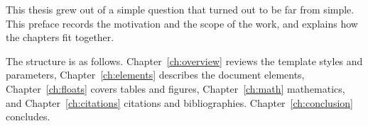 \begin{frontchapter}[Preface]
This thesis grew out of a simple question that turned out to be far from
simple. This preface records the motivation and the scope of the work,
and explains how the chapters fit together.

The structure is as follows. Chapter~\ref{ch:overview} reviews the
template styles and parameters, Chapter~\ref{ch:elements} describes the
document elements, Chapter~\ref{ch:floats} covers tables and figures,
Chapter~\ref{ch:math} mathematics, and Chapter~\ref{ch:citations}
citations and bibliographies. Chapter~\ref{ch:conclusion} concludes.

\end{frontchapter}